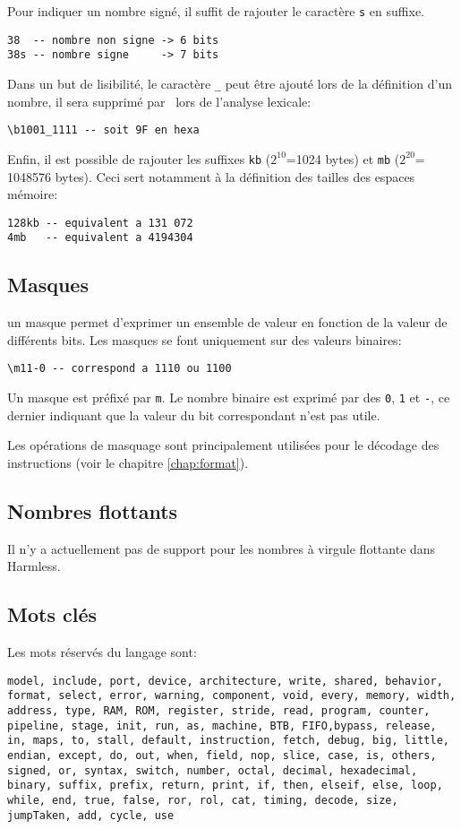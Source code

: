 Pour indiquer un nombre signé, il suffit de rajouter le caractère \texttt{s} en suffixe.
\begin{lstlisting}
38  -- nombre non signe -> 6 bits
38s -- nombre signe     -> 7 bits
\end{lstlisting}

Dans un but de lisibilité, le caractère \texttt{\_} peut être ajouté lors de la définition d'un nombre, il sera supprimé par \harmless\ lors de l'analyse lexicale:
\begin{lstlisting}
\b1001_1111 -- soit 9F en hexa
\end{lstlisting}

Enfin, il est possible de rajouter les suffixes \texttt{kb} ($2^{10}$=1024 bytes) et \texttt{mb} ($2^{20}$= 1048576 bytes). Ceci sert notamment à la définition des tailles des espaces mémoire:
\begin{lstlisting}
128kb -- equivalent a 131 072
4mb   -- equivalent a 4194304
\end{lstlisting}

\subsection{Masques}
\label{masque}
un masque permet d'exprimer un ensemble de valeur en fonction de la valeur de différents bits. Les masques se font uniquement sur des valeurs binaires:
\begin{lstlisting}
\m11-0 -- correspond a 1110 ou 1100
\end{lstlisting}
Un masque est préfixé par \texttt{\bs m}. Le nombre binaire est exprimé par des \texttt{0}, \texttt{1} et \texttt{-}, ce dernier indiquant que la valeur du bit correspondant n'est pas utile. 

Les opérations de masquage sont principalement utilisées pour le décodage des instructions (voir le chapitre \ref{chap:format}).

\subsection{Nombres flottants} 
Il n'y a actuellement pas de support pour les nombres à virgule flottante dans Harmless.

\subsection{Mots clés}
\label{keywords}
Les mots réservés du langage sont:
\begin{lstlisting}
model, include, port, device, architecture, write, shared, behavior, format, select, error, warning, component, void, every, memory, width, address, type, RAM, ROM, register, stride, read, program, counter, pipeline, stage, init, run, as, machine, BTB, FIFO,bypass, release, in, maps, to, stall, default, instruction, fetch, debug, big, little, endian, except, do, out, when, field, nop, slice, case, is, others, signed, or, syntax, switch, number, octal, decimal, hexadecimal, binary, suffix, prefix, return, print, if, then, elseif, else, loop, while, end, true, false, ror, rol, cat, timing, decode, size, jumpTaken, add, cycle, use
\end{lstlisting}

